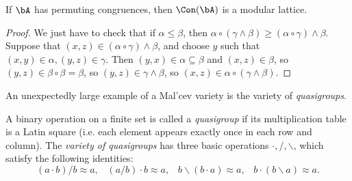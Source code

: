 \begin{center}
\end{center}

\begin{prop} If $\bA$ has permuting congruences, then $\Con(\bA)$ is a modular lattice.
\end{prop}
\begin{proof} We just have to check that if $\alpha \le \beta$, then $\alpha \circ (\gamma \wedge \beta) \ge (\alpha \circ \gamma) \wedge \beta$. Suppose that $(x,z) \in (\alpha \circ \gamma) \wedge \beta$, and choose $y$ such that $(x,y) \in \alpha, (y,z) \in \gamma$. Then $(y,x) \in \alpha \subseteq \beta$ and $(x,z) \in \beta$, so $(y,z) \in \beta \circ \beta = \beta$, so $(y,z) \in \gamma\wedge \beta$, so $(x,z) \in \alpha \circ (\gamma \wedge \beta)$.
\end{proof}


An unexpectedly large example of a Mal'cev variety is the variety of \emph{quasigroups}.

\begin{defn} A binary operation on a finite set is called a \emph{quasigroup} if its multiplication table is a Latin square (i.e. each element appears exactly once in each row and column). The \emph{variety of quasigroups} has three basic operations $\cdot, /, \backslash$, which satisfy the following identities:
\[
(a\cdot b)/b \approx a, \;\;\; (a/b)\cdot b \approx a, \;\;\; b\backslash(b\cdot a) \approx a, \;\;\; b\cdot (b\backslash a) \approx a.
\]
\end{defn}

